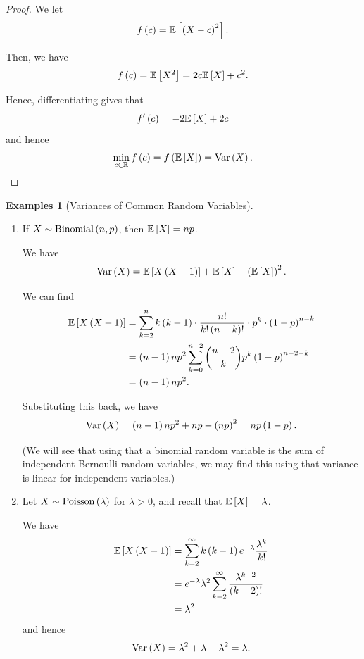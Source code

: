 \documentclass{article}
\theoremstyle{definition}
\newtheorem{examples}[theorem]{Examples}
\theoremstyle{remark}
\newcommand{\RR}{\mathbb{R}}
\newcommand{\Expt}{\mathbb{E}}
\newcommand{\Var}{\operatorname{Var}}
\newcommand{\Binomial}{\operatorname{Binomial}}
\newcommand{\Poisson}{\operatorname{Poisson}}
\begin{document}
\begin{proof}
    We let
    \[
        f\pqty{c} = \Expt\bqty{\pqty{X - c}^2}.
    \]

    Then, we have
    \[
        f\pqty{c} = \Expt\bqty{X^2} = 2c \Expt\bqty{X} + c^2.
    \]

    Hence, differentiating gives that
    \[
        f'\pqty{c} = -2 \Expt\bqty{X} + 2c
    \]
    and hence
    \[
        \min_{c \in \RR} f\pqty{c} = f\pqty{\Expt\bqty{X}} = \Var\pqty{X}.
    \]
\end{proof}

\begin{examples}[Variances of Common Random Variables]
    \label{ex:variance-rv}%
    \begin{enumerate}
        \item If \(X \sim \Binomial\pqty{n, p}\), then \(\Expt\bqty{X} = np\).
        
        We have
        \[
            \Var\pqty{X} = \Expt\bqty{X\pqty{X - 1}} + \Expt\bqty{X} - \pqty{\Expt\bqty{X}}^2.
        \]

        We can find
        \begin{align*}
            \Expt\bqty{X \pqty{X - 1}} &= \sum_{k = 2}^{n} k\pqty{k - 1} \cdot \frac{n!}{k! \pqty{n - k}!} \cdot p^k \cdot \pqty{1 - p}^{n - k} \\
            &= \pqty{n - 1} n p^2 \sum_{k = 0}^{n - 2} \binom{n - 2}{k} p^k \pqty{1 - p}^{n - 2 - k} \\
            &= \pqty{n - 1} n p^2.
        \end{align*}

        Substituting this back, we have
        \[
            \Var\pqty{X} = \pqty{n - 1} np^2 + np - \pqty{np}^2 = np \pqty{1 - p}.
        \]

        (We will see that using that a binomial random variable is the sum of independent Bernoulli random variables, we may find this using that variance is linear for independent variables.)

        \item Let \(X \sim \Poisson\pqty{\lambda}\) for \(\lambda > 0\), and recall that \(\Expt\bqty{X} = \lambda\).
        
        We have
        \begin{align*}
            \Expt\bqty{X \pqty{X - 1}} &= \sum_{k = 2}^{\infty} k \pqty{k - 1} e^{-\lambda} \frac{\lambda^k}{k!} \\
            &= e^{-\lambda} \lambda^2 \sum_{k = 2}^{\infty} \frac{\lambda^{k - 2}}{\pqty{k - 2}!} \\
            &= \lambda^2
        \end{align*}
        and hence
        \[
            \Var\pqty{X} = \lambda^2 + \lambda - \lambda^2 = \lambda.
        \]
    \end{enumerate}
\end{examples}
\end{document}
